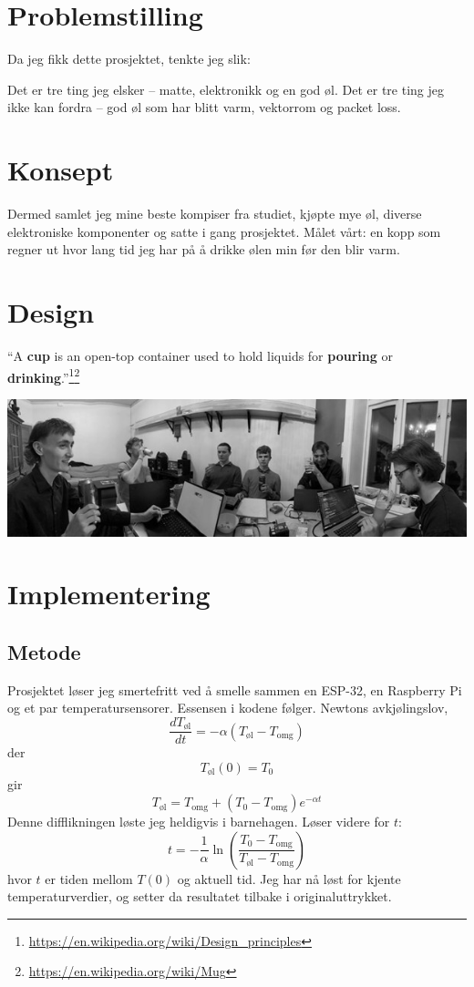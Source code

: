 \documentclass{article}
\begin{document}
\newpage
\tableofcontents{}

\section{Problemstilling}
Da jeg fikk dette prosjektet, tenkte jeg slik:

Det er tre ting jeg elsker – matte, elektronikk og en god øl.  
Det er tre ting jeg ikke kan fordra – god øl som har blitt varm, vektorrom og packet loss.

\section{Konsept}
Dermed samlet jeg mine beste kompiser fra studiet, kjøpte mye øl, diverse elektroniske komponenter og satte i gang prosjektet.  
Målet vårt: en kopp som regner ut hvor lang tid jeg har på å drikke ølen min før den blir varm.

\section{Design}
``A \textbf{cup} is an open-top container used to hold liquids for \textbf{pouring} or \textbf{drinking}.''\footnote{\url{https://en.wikipedia.org/wiki/Design_principles}}\footnote{\url{https://en.wikipedia.org/wiki/Mug}}
\vfill
\begin{center}
    \includegraphics[width=\textwidth]{Panorama_pilsing.jpg}
\end{center}
\newpage
\section{Implementering}
\subsection{Metode}
Prosjektet løser jeg smertefritt ved å smelle sammen en ESP-32, en Raspberry Pi og et par temperatursensorer. Essensen i kodene følger.
Newtons avkjølingslov,
\[ 
\frac{dT_{\text{øl}}}{dt} = -\alpha(T_{\text{øl}} - T_{\text{omg}})
\]
der
\[ 
T_{\text{øl}}(0) = T_{0}
\]
gir
\[ 
T_{\text{øl}} = T_{\text{omg}} + (T_{0} - T_{\text{omg}})e^{-\alpha t}
\]
Denne difflikningen løste jeg heldigvis i barnehagen.
Løser videre for \(t\):
\[ 
t = -\frac{1}{\alpha} \ln \left(\frac{T_{0} - T_{\text{omg}}}{T_{\text{øl}} - T_{\text{omg}}}\right)
\]
hvor \(t\) er tiden mellom \(T(0)\) og aktuell tid. Jeg har nå løst for kjente temperaturverdier, og setter da resultatet tilbake i originaluttrykket.
\end{document}
